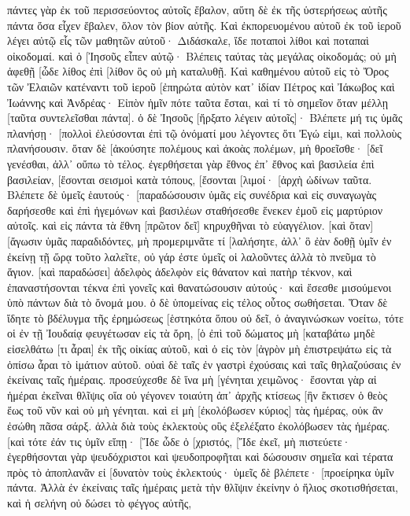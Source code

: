 πάντες γὰρ ἐκ τοῦ περισσεύοντος αὐτοῖς ἔβαλον, αὕτη δὲ ἐκ τῆς ὑστερήσεως αὐτῆς πάντα ὅσα εἶχεν ἔβαλεν, ὅλον τὸν βίον αὐτῆς. 
Καὶ ἐκπορευομένου αὐτοῦ ἐκ τοῦ ἱεροῦ λέγει αὐτῷ εἷς τῶν μαθητῶν αὐτοῦ· Διδάσκαλε, ἴδε ποταποὶ λίθοι καὶ ποταπαὶ οἰκοδομαί. 
καὶ ὁ [Ἰησοῦς εἶπεν αὐτῷ· Βλέπεις ταύτας τὰς μεγάλας οἰκοδομάς; οὐ μὴ ἀφεθῇ [ὧδε λίθος ἐπὶ [λίθον ὃς οὐ μὴ καταλυθῇ. 
Καὶ καθημένου αὐτοῦ εἰς τὸ Ὄρος τῶν Ἐλαιῶν κατέναντι τοῦ ἱεροῦ [ἐπηρώτα αὐτὸν κατ᾽ ἰδίαν Πέτρος καὶ Ἰάκωβος καὶ Ἰωάννης καὶ Ἀνδρέας· 
Εἰπὸν ἡμῖν πότε ταῦτα ἔσται, καὶ τί τὸ σημεῖον ὅταν μέλλῃ [ταῦτα συντελεῖσθαι πάντα]. 
ὁ δὲ Ἰησοῦς [ἤρξατο λέγειν αὐτοῖς]· Βλέπετε μή τις ὑμᾶς πλανήσῃ· 
[πολλοὶ ἐλεύσονται ἐπὶ τῷ ὀνόματί μου λέγοντες ὅτι Ἐγώ εἰμι, καὶ πολλοὺς πλανήσουσιν. 
ὅταν δὲ [ἀκούσητε πολέμους καὶ ἀκοὰς πολέμων, μὴ θροεῖσθε· [δεῖ γενέσθαι, ἀλλ᾽ οὔπω τὸ τέλος. 
ἐγερθήσεται γὰρ ἔθνος ἐπ᾽ ἔθνος καὶ βασιλεία ἐπὶ βασιλείαν, [ἔσονται σεισμοὶ κατὰ τόπους, [ἔσονται [λιμοί· [ἀρχὴ ὠδίνων ταῦτα. 
Βλέπετε δὲ ὑμεῖς ἑαυτούς· [παραδώσουσιν ὑμᾶς εἰς συνέδρια καὶ εἰς συναγωγὰς δαρήσεσθε καὶ ἐπὶ ἡγεμόνων καὶ βασιλέων σταθήσεσθε ἕνεκεν ἐμοῦ εἰς μαρτύριον αὐτοῖς. 
καὶ εἰς πάντα τὰ ἔθνη [πρῶτον δεῖ] κηρυχθῆναι τὸ εὐαγγέλιον. 
[καὶ ὅταν] [ἄγωσιν ὑμᾶς παραδιδόντες, μὴ προμεριμνᾶτε τί [λαλήσητε, ἀλλ᾽ ὃ ἐὰν δοθῇ ὑμῖν ἐν ἐκείνῃ τῇ ὥρᾳ τοῦτο λαλεῖτε, οὐ γάρ ἐστε ὑμεῖς οἱ λαλοῦντες ἀλλὰ τὸ πνεῦμα τὸ ἅγιον. 
[καὶ παραδώσει] ἀδελφὸς ἀδελφὸν εἰς θάνατον καὶ πατὴρ τέκνον, καὶ ἐπαναστήσονται τέκνα ἐπὶ γονεῖς καὶ θανατώσουσιν αὐτούς· 
καὶ ἔσεσθε μισούμενοι ὑπὸ πάντων διὰ τὸ ὄνομά μου. ὁ δὲ ὑπομείνας εἰς τέλος οὗτος σωθήσεται. 
Ὅταν δὲ ἴδητε τὸ βδέλυγμα τῆς ἐρημώσεως [ἑστηκότα ὅπου οὐ δεῖ, ὁ ἀναγινώσκων νοείτω, τότε οἱ ἐν τῇ Ἰουδαίᾳ φευγέτωσαν εἰς τὰ ὄρη, 
[ὁ ἐπὶ τοῦ δώματος μὴ [καταβάτω μηδὲ εἰσελθάτω [τι ἆραι] ἐκ τῆς οἰκίας αὐτοῦ, 
καὶ ὁ εἰς τὸν [ἀγρὸν μὴ ἐπιστρεψάτω εἰς τὰ ὀπίσω ἆραι τὸ ἱμάτιον αὐτοῦ. 
οὐαὶ δὲ ταῖς ἐν γαστρὶ ἐχούσαις καὶ ταῖς θηλαζούσαις ἐν ἐκείναις ταῖς ἡμέραις. 
προσεύχεσθε δὲ ἵνα μὴ [γένηται χειμῶνος· 
ἔσονται γὰρ αἱ ἡμέραι ἐκεῖναι θλῖψις οἵα οὐ γέγονεν τοιαύτη ἀπ᾽ ἀρχῆς κτίσεως [ἣν ἔκτισεν ὁ θεὸς ἕως τοῦ νῦν καὶ οὐ μὴ γένηται. 
καὶ εἰ μὴ [ἐκολόβωσεν κύριος] τὰς ἡμέρας, οὐκ ἂν ἐσώθη πᾶσα σάρξ. ἀλλὰ διὰ τοὺς ἐκλεκτοὺς οὓς ἐξελέξατο ἐκολόβωσεν τὰς ἡμέρας. 
[καὶ τότε ἐάν τις ὑμῖν εἴπῃ· [Ἴδε ὧδε ὁ [χριστός, [Ἴδε ἐκεῖ, μὴ πιστεύετε· 
ἐγερθήσονται γὰρ ψευδόχριστοι καὶ ψευδοπροφῆται καὶ δώσουσιν σημεῖα καὶ τέρατα πρὸς τὸ ἀποπλανᾶν εἰ [δυνατὸν τοὺς ἐκλεκτούς· 
ὑμεῖς δὲ βλέπετε· [προείρηκα ὑμῖν πάντα. 
Ἀλλὰ ἐν ἐκείναις ταῖς ἡμέραις μετὰ τὴν θλῖψιν ἐκείνην ὁ ἥλιος σκοτισθήσεται, καὶ ἡ σελήνη οὐ δώσει τὸ φέγγος αὐτῆς, 
